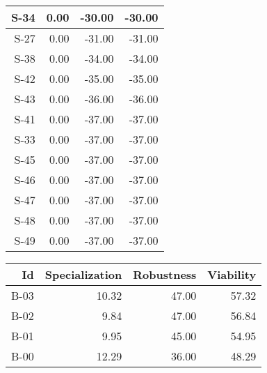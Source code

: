 \begin{tabular}{ | r | r | r | r | }
    \hline
                  S-34  &            0.00  &          -30.00  &          -30.00  \\
    \hline
                  S-27  &            0.00  &          -31.00  &          -31.00  \\
    \hline
                  S-38  &            0.00  &          -34.00  &          -34.00  \\
    \hline
                  S-42  &            0.00  &          -35.00  &          -35.00  \\
    \hline
                  S-43  &            0.00  &          -36.00  &          -36.00  \\
    \hline
                  S-41  &            0.00  &          -37.00  &          -37.00  \\
    \hline
                  S-33  &            0.00  &          -37.00  &          -37.00  \\
    \hline
                  S-45  &            0.00  &          -37.00  &          -37.00  \\
    \hline
                  S-46  &            0.00  &          -37.00  &          -37.00  \\
    \hline
                  S-47  &            0.00  &          -37.00  &          -37.00  \\
    \hline
                  S-48  &            0.00  &          -37.00  &          -37.00  \\
    \hline
                  S-49  &            0.00  &          -37.00  &          -37.00  \\
    \hline
\end{tabular}


\begin{tabular}{ | r | r | r | r | }
    \hline
                    Id  &  Specialization  &      Robustness  &       Viability  \\
    \hline
    \hline
                  B-03  &           10.32  &           47.00  &           57.32  \\
    \hline
                  B-02  &            9.84  &           47.00  &           56.84  \\
    \hline
                  B-01  &            9.95  &           45.00  &           54.95  \\
    \hline
                  B-00  &           12.29  &           36.00  &           48.29  \\
    \hline
\end{tabular}



